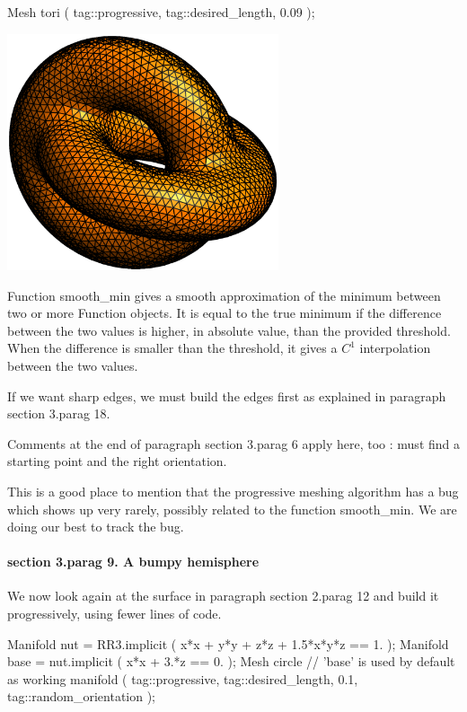    Mesh tori ( tag::progressive, tag::desired_length, 0.09 );
\endverbatim

\centerline{\includegraphics[width=80mm]{two-tori.eps}}

Function {\codett smooth\_min} gives a smooth approximation of the minimum between two or more
{\codett Function} objects.
It is equal to the true minimum if the difference between the two values is higher, in
absolute value, than the provided threshold.
When the difference is smaller than the threshold, it gives a $ C^1 $ interpolation between
the two values.

If we want sharp edges, we must build the edges first as explained in paragraph
\numb section 3.\numb parag 18.

Comments at the end of paragraph \numb section 3.\numb parag 6 apply here, too :
{\maniFEM} must find a starting point and the right orientation.

This is a good place to mention that the progressive meshing algorithm has a bug
which shows up very rarely, possibly related to the function {\codett smooth\_min}.
We are doing our best to track the bug.


\paragraph{\numb section 3.\numb parag 9. A bumpy hemisphere}

We now look again at the surface in paragraph \numb section 2.\numb parag 12
and build it progressively, using fewer lines of code.

\verbatim
   Manifold nut = RR3.implicit ( x*x + y*y + z*z + 1.5*x*y*z == 1. );
   Manifold base = nut.implicit ( x*x + 3.*z == 0. );
   Mesh circle  // 'base' is used by default as working manifold
      ( tag::progressive, tag::desired_length, 0.1, tag::random_orientation );
   
